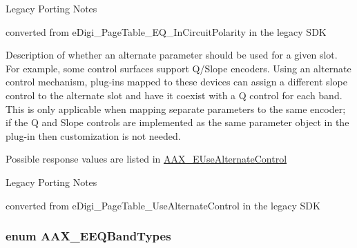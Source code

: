 \begin{Desc}
\begin{description}
\begin{DoxyRefDesc}{Legacy Porting Notes}
\item[\hyperlink{a00384__porting_notes000025}{Legacy Porting Notes}]converted from {\ttfamily e\+Digi\+\_\+\+Page\+Table\+\_\+\+E\+Q\+\_\+\+In\+Circuit\+Polarity} in the legacy S\+D\+K\end{DoxyRefDesc}
\item[{\em 
\hypertarget{a00206_aa169208a2ce713fa021e20deb2eaf608a1a0d975a333d3aee81b22f878697e9c4}{}A\+A\+X\+\_\+e\+Page\+Table\+\_\+\+Use\+Alternate\+Control\label{a00206_aa169208a2ce713fa021e20deb2eaf608a1a0d975a333d3aee81b22f878697e9c4}
}]Description of whether an alternate parameter should be used for a given slot. For example, some control surfaces support Q/\+Slope encoders. Using an alternate control mechanism, plug-\/ins mapped to these devices can assign a different slope control to the alternate slot and have it coexist with a Q control for each band. This is only applicable when mapping separate parameters to the same encoder; if the Q and Slope controls are implemented as the same parameter object in the plug-\/in then customization is not needed.

Possible response values are listed in \hyperlink{a00206_abbcc8b4e8207262a5dd9e32047a51a29}{A\+A\+X\+\_\+\+E\+Use\+Alternate\+Control}

\begin{DoxyRefDesc}{Legacy Porting Notes}
\item[\hyperlink{a00384__porting_notes000026}{Legacy Porting Notes}]converted from {\ttfamily e\+Digi\+\_\+\+Page\+Table\+\_\+\+Use\+Alternate\+Control} in the legacy S\+D\+K\end{DoxyRefDesc}
\end{description}
\end{Desc}
\hypertarget{a00206_a9ec6da28e827496514bd15d6f2b26d95}{}
\subsubsection[{A\+A\+X\+\_\+\+E\+E\+Q\+Band\+Types}]{\setlength{\rightskip}{0pt plus 5cm}enum {\bf A\+A\+X\+\_\+\+E\+E\+Q\+Band\+Types}}\label{a00206_a9ec6da28e827496514bd15d6f2b26d95}


